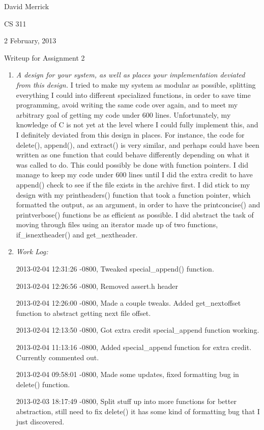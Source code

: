 \documentclass[letterpaper,10pt,titlepage]{article}
\begin{document}
David Merrick

CS 311

2 February, 2013

\begin{center}
{\LARGE Writeup for Assignment 2}
\end{center}

\begin{enumerate}
\item \emph{A design for your system, as well as places your implementation deviated from this design.}
I tried to make my system as modular as possible, splitting everything I could into different specialized functions, in order to save time programming, avoid writing the same code over again, and to meet my arbitrary goal of getting my code under 600 lines. Unfortunately, my knowledge of C is not yet at the level where I could fully implement this, and I definitely deviated from this design in places. For instance, the code for delete(), append(), and extract() is very similar, and perhaps could have been written as one function that could behave differently depending on what it was called to do. This could possibly be done with function pointers. I did manage to keep my code under 600 lines until I did the extra credit to have append() check to see if the file exists in the archive first. I did stick to my design with my printheaders() function that took a function pointer, which formatted the output, as an argument, in order to have the printconcise() and printverbose() functions be as efficient as possible. I did abstract the task of moving through files using an iterator made up of two functions, if\_isnextheader() and get\_nextheader.

\item \emph{Work Log:}

2013-02-04 12:31:26 -0800, Tweaked special\_append() function.

2013-02-04 12:26:56 -0800, Removed assert.h header

2013-02-04 12:26:00 -0800, Made a couple tweaks. Added get\_nextoffset function to abstract getting next file offset.

2013-02-04 12:13:50 -0800, Got extra credit special\_append function working.

2013-02-04 11:13:16 -0800, Added special\_append function for extra credit. Currently commented out.

2013-02-04 09:58:01 -0800, Made some updates, fixed formatting bug in delete() function.

2013-02-03 18:17:49 -0800, Split stuff up into more functions for better abstraction, still need to fix delete()\; it has some kind of formatting bug that I just discovered.


\end{enumerate}
\end{document}
